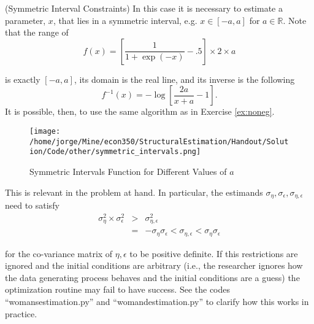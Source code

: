 \begin{example} (Symmetric Interval Constraints)
In this case it is necessary to estimate a parameter, $x$, that lies in a symmetric interval, e.g. $x \in [-a,a]$ for  $a \in \mathbb{R}$. Note that the range of
\begin{equation}
f(x) = \left[ \frac{1}{1+ \exp(-x)} -.5 \right] \times 2 \times a
\end{equation}

\noindent is exactly $[-a,a]$, its domain is the real line, and its inverse is the following 
\begin{equation}
f^{-1}(x) = - \log \left[ \frac{2a}{x+a} - 1 \right].
\end{equation}
\noindent It is possible, then, to use the same algorithm as in Exercise \ref{ex:noneg}.
\end{example}

\begin{center}
\begin{figure}[H]
\caption{Symmetric Intervals Function for Different Values of $a$}
\centering
\texttt{[image: /home/jorge/Mine/econ350/StructuralEstimation/Handout/Solution/Code/other/symmetric\_intervals.png]}
\end{figure}
\end{center}

\indent This is relevant in the problem at hand. In particular, the estimands $\sigma_{\eta},\sigma_{\epsilon},\sigma_{\eta,\epsilon}$ need to satisfy
\begin{eqnarray}
\sigma_{\eta}^2 \times \sigma_{\epsilon}^2 &>& \sigma_{\eta,\epsilon}^2 \nonumber \\
&=& -\sigma_{\eta} \sigma_{\epsilon} < \sigma_{\eta,\epsilon} < \sigma_{\eta} \sigma_{\epsilon}
\end{eqnarray}

\noindent for the co-variance matrix of $\eta,\epsilon$ to be positive definite. If this restrictions are ignored and the initial conditions are arbitrary (i.e., the researcher ignores how the data generating process behaves and the initial conditions are a guess) the optimization routine may fail to have success. See the codes ``womansestimation.py'' and ``womandestimation.py'' to clarify how this works in practice.

